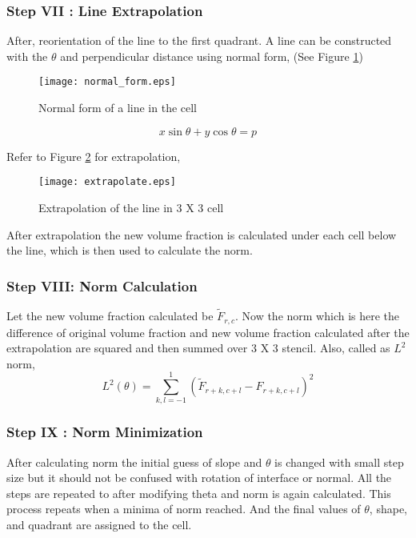 \subsubsection{Step VII : Line Extrapolation}
After, reorientation of the line to the first quadrant. A line can be constructed with the $\theta$ and perpendicular distance using normal form, (See Figure \ref{Fig:normal})
\begin{figure}
 \centering
 \texttt{[image: normal\_form.eps]}
 \caption{Normal form of a line in the cell}
 \label{Fig:normal}
\end{figure}
\begin{equation}
 x\sin\theta+y\cos\theta = p
\end{equation}

Refer to Figure \ref{Fig:extrapolation} for extrapolation,

\begin{figure}%
 \centering
 \texttt{[image: extrapolate.eps]}
 \caption{Extrapolation of the line in 3 X 3 cell}
 \label{Fig:extrapolation}
\end{figure}

After extrapolation the new volume fraction is calculated under each cell below the line, which is then used to calculate the norm.
\subsubsection{Step VIII: Norm Calculation}
Let the new volume fraction calculated be $\widetilde F_{r,c}$. Now the norm which is here the difference of original volume fraction and new 
volume fraction calculated after the extrapolation are squared and then summed over 3 X 3 stencil. Also, called as $L^2$ norm, \\
\begin{equation*}
 \boxed{L^2(\theta) =  \sum_{k,l=-1}^{1}(\widetilde F_{r+k,c+l}-F_{r+k,c+l})^2}
\end{equation*}

\subsubsection{Step IX : Norm Minimization}
After calculating norm the initial guess of slope and $\theta$ is changed with small step size but it should not be confused with rotation of interface or normal.
All the steps are repeated to after modifying theta and norm is again calculated. This process repeats when a minima of norm reached. And the final values of $\theta$,
shape, and quadrant are assigned to the cell.

